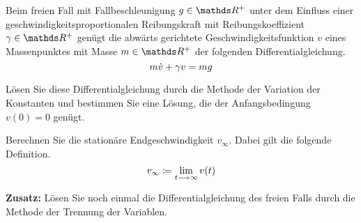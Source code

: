 \begin{atiTask}[
  title = Freier Fall mit Reibung
]
 Beim freien Fall mit Fallbeschleunigung $g\in\setR^+$ unter dem Einfluss einer geschwindigkeitsproportionalen Reibungskraft mit Reibungskoeffizient $\gamma\in\setR^+$ genügt die abwärts gerichtete Geschwindigkeitsfunktion $v$ eines Massenpunktes mit Masse $m\in\setR^+$ der folgenden Differentialgleichung.
 \[
   m\dot{v} + \gamma v = mg
 \]
 \begin{atiSubtasks}
   \item{
    Lösen Sie diese Differentialgleichung durch die Methode der Variation der Konstanten und bestimmen Sie eine Lösung, die der Anfangsbedingung $v(0)=0$ genügt.
  }
  \item{
    Berechnen Sie die stationäre Endgeschwindigkeit $v_\infty$.
    Dabei gilt die folgende Definition.
    \[
      v_\infty \define \lim_{t\conv\infty}v(t)
    \]
  }
  \item{
    \textbf{Zusatz:}
    Lösen Sie noch einmal die Differentialgleichung des freien Falls durch die Methode der Trennung der Variablen.

  }
 \end{atiSubtasks}
\end{atiTask}
